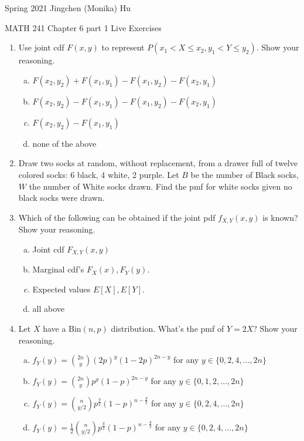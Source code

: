 \documentclass[11pt]{article}
\begin{document}
\enlargethispage{\baselineskip}

Spring 2021 \hfill Jingchen (Monika) Hu\\

\begin{center}
{\huge MATH 241 Chapter 6 part 1 Live Exercises}	\\
\end{center}
\vspace{0.5cm}

\begin{enumerate}


\item Use joint cdf $F(x, y)$ to represent $P(x_1 < X \leq x_2, y_1 < Y \leq y_2)$. Show your reasoning.

\begin{enumerate}[(a)]
\item $F(x_2, y_2) + F(x_1, y_1) - F(x_1, y_2) - F(x_2, y_1)$
\item $F(x_2, y_2) - F(x_1, y_1) - F(x_1, y_2) - F(x_2, y_1)$
\item $F(x_2, y_2) - F(x_1, y_1)$
\item none of the above
\end{enumerate}

\item Draw two socks at random, without replacement, from a drawer full of twelve colored socks:
6 black, 4 white, 2 purple. Let $B$ be the number of Black socks, $W$ the number of White socks drawn. Find the pmf for white socks given no black socks were drawn.

\item Which of the following can be obtained if the joint pdf $f_{X, Y}(x, y)$ is known? Show your reasoning.

\begin{enumerate}[(a)]
\item Joint cdf $F_{X, Y}(x, y)$
\item Marginal cdf's $F_X(x), F_Y(y)$.
\item Expected values $E[X], E[Y]$.
\item all above
\end{enumerate}

\item Let $X$ have a Bin$(n, p)$ distribution. What's the pmf of $Y = 2X$? Show your reasoning.

\begin{enumerate}[(a)]
\item $f_Y(y) = {2n \choose y}(2p)^y (1-2p)^{2n - y}$ for any $y \in \{0, 2, 4, \ldots, 2n\}$
\item $f_Y(y) = {2n \choose y}p^y (1-p)^{2n - y}$ for any $y \in \{0, 1, 2, \ldots, 2n\}$
\item $f_Y(y) = {n \choose y/2}p^{\frac{y}{2}} (1-p)^{n - \frac{y}{2}}$ for any $y \in \{0, 2, 4, \ldots, 2n\}$
\item $f_Y(y) = \frac{1}{2}{n \choose y/2}p^{\frac{y}{2}} (1-p)^{n - \frac{y}{2}}$ for any $y \in \{0, 2, 4, \ldots, 2n\}$
\end{enumerate}



\end{enumerate}
\end{document}
